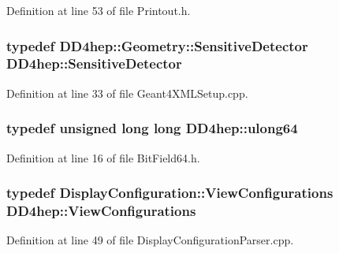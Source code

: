 Definition at line 53 of file Printout.h.\hypertarget{namespace_d_d4hep_ae77e9f3818be8d649b030c537e235efe}{
\subsubsection[{SensitiveDetector}]{\setlength{\rightskip}{0pt plus 5cm}typedef {\bf DD4hep::Geometry::SensitiveDetector} {\bf DD4hep::SensitiveDetector}}}
\label{namespace_d_d4hep_ae77e9f3818be8d649b030c537e235efe}


Definition at line 33 of file Geant4XMLSetup.cpp.\hypertarget{namespace_d_d4hep_a7a8348d075fd0a3bafc06de7cde7a750}{
\subsubsection[{ulong64}]{\setlength{\rightskip}{0pt plus 5cm}typedef unsigned long long {\bf DD4hep::ulong64}}}
\label{namespace_d_d4hep_a7a8348d075fd0a3bafc06de7cde7a750}


Definition at line 16 of file BitField64.h.\hypertarget{namespace_d_d4hep_a9c889ac82251df068ece7fbba1c2d1c0}{
\subsubsection[{ViewConfigurations}]{\setlength{\rightskip}{0pt plus 5cm}typedef {\bf DisplayConfiguration::ViewConfigurations} {\bf DD4hep::ViewConfigurations}}}
\label{namespace_d_d4hep_a9c889ac82251df068ece7fbba1c2d1c0}


Definition at line 49 of file DisplayConfigurationParser.cpp.

